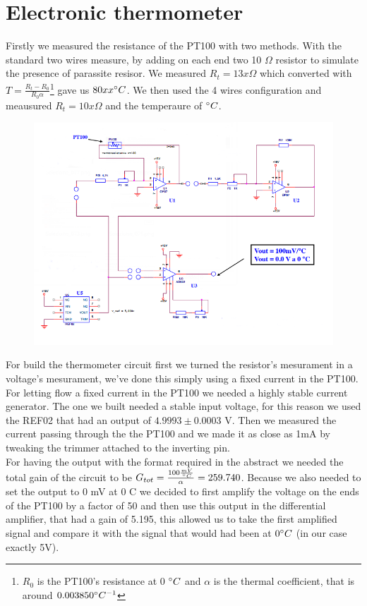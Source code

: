 \section{Electronic thermometer}
Firstly we measured the resistance of the PT100 with two methods. With the standard two wires measure, by adding on each end two 10 $\Omega$ resistor to simulate the presence of parassite resisor. We measured $R_t = 13x \Omega$ which converted with $T = \frac{R_t - R_0}{R_0 \alpha}$\footnote{ $R_0$ is the PT100's resistance at 0 $\degree C$ and $\alpha$ is the thermal coefficient, that is around $0.003850 \degree C^{-1}$  }
gave us $80 xx \degree C$. We then used the 4 wires configuration and meausured $R_t = 10x \Omega$ and the temperaure of  $\degree C$.
\begin{figure}[H]
\centering
\includegraphics[width=.7\textwidth]{6/circuit.png}
\end{figure}
For build the thermometer circuit first we turned the resistor's mesurament in a voltage's mesurament, we've done this simply using a fixed current in the PT100.
For letting flow a fixed current in the PT100 we needed a highly stable current generator. The one we built needed a stable input voltage, for this  reason we used the REF02 that had an output of $4.9993 \pm 0.0003$ V. Then we measured the current passing through the the PT100 and we made it as close as 1mA by tweaking the trimmer attached to the inverting pin.\\
For having the output with the format required in the abstract we needed the total gain of the circuit to be $G_{tot} = \frac{100 \frac{mV}{\degree C}}{\alpha} = 259.740$. Because we also needed to set the output to 0 mV at 0 \degree C we decided to first amplify the voltage on the ends of the PT100 by a factor of 50 and then use this output in the differential amplifier, that had a gain of 5.195, this allowed us to take the first amplified signal and compare it with the signal that would had been at $0\degree C$ (in our case exactly 5V).\\
